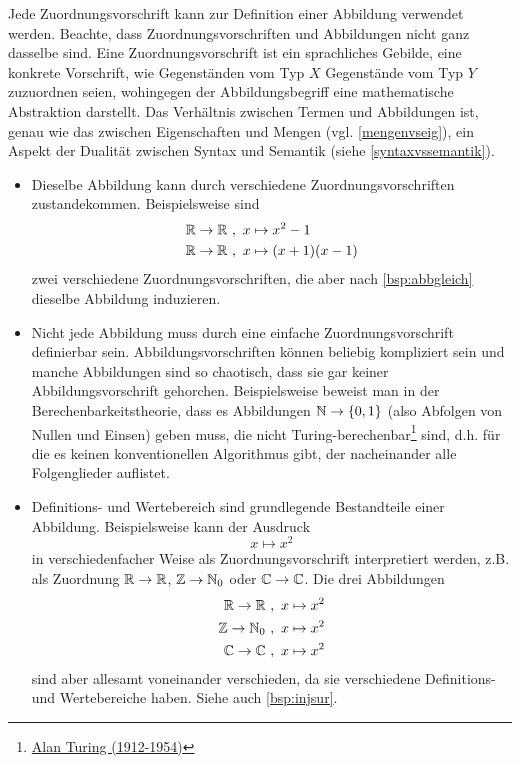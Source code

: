 \begin{bem} \label{zuordvsabb}
    Jede Zuordnungsvorschrift kann zur Definition einer Abbildung verwendet werden. Beachte, dass Zuordnungsvorschriften und Abbildungen nicht ganz dasselbe sind. Eine Zuordnungsvorschrift ist ein sprachliches Gebilde, eine konkrete Vorschrift, wie Gegenständen vom Typ $X$ Gegenstände vom Typ $Y$ zuzuordnen seien, wohingegen der Abbildungsbegriff eine mathematische Abstraktion darstellt. Das Verhältnis zwischen Termen und Abbildungen ist, genau wie das zwischen Eigenschaften und Mengen (vgl. \cref{mengenvseig}), ein Aspekt der Dualität zwischen Syntax und Semantik (siehe \cref{syntaxvssemantik}).
    \begin{itemize}
        \item Dieselbe Abbildung kann durch verschiedene Zuordnungsvorschriften zustandekommen. Beispielsweise sind
        \begin{align*}
            \mathbb R \to \mathbb R \ &,\ x\mapsto x^2-1 \\
            \mathbb R \to \mathbb R \ &,\ x\mapsto (x+1)(x-1)
        \end{align*}
        zwei verschiedene Zuordnungsvorschriften, die aber nach \cref{bsp:abbgleich} dieselbe Abbildung induzieren.
        \item Nicht jede Abbildung muss durch eine einfache Zuordnungsvorschrift definierbar sein. Abbildungsvorschriften können beliebig kompliziert sein und manche Abbildungen sind so chaotisch, dass sie gar keiner Abbildungsvorschrift gehorchen. Beispielsweise beweist man in der Berechenbarkeitstheorie, dass es Abbildungen $\mathbb N \to \{0,1\}$ (also Abfolgen von Nullen und Einsen) geben muss, die nicht Turing-berechenbar\footnote{\href{https://de.wikipedia.org/wiki/Alan_Turing}{Alan Turing (1912-1954)}} sind, d.h. für die es keinen konventionellen Algorithmus gibt, der nacheinander alle Folgenglieder auflistet.
        \item Definitions- und Wertebereich sind grundlegende Bestandteile einer Abbildung. Beispielsweise kann der Ausdruck
            \[ x\mapsto x^2 \]
        in verschiedenfacher Weise als Zuordnungsvorschrift interpretiert werden, z.B. als Zuordnung $\mathbb R\to \mathbb R$, $\mathbb Z\to \mathbb N_0$ oder $\mathbb C\to \mathbb C$. Die drei Abbildungen
        \begin{align*}
            \mathbb R \to \mathbb R \ & ,\ x\mapsto x^2 \\
            \mathbb Z \to \mathbb N_0 \ & ,\ x\mapsto x^2 \\
            \mathbb C \to \mathbb C \ &,\ x\mapsto x^2 
        \end{align*}
        sind aber allesamt voneinander verschieden, da sie verschiedene Definitions- und Wertebereiche haben. Siehe auch \cref{bsp:injsur}.
    \end{itemize}
\end{bem}


